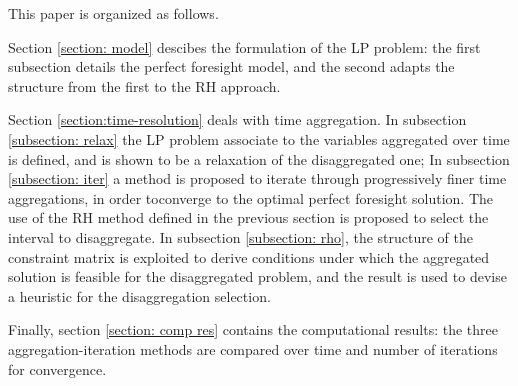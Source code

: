 \documentclass[smallextended,natbib]{svjour3}       %
\numberwithin{theorem}{section}
\begin{document}


This paper is organized as follows. 

Section \ref{section: model} descibes the formulation of the LP problem: the first subsection details the perfect foresight model, and the second adapts the structure from the first to the RH approach. 

Section \ref{section:time-resolution} deals with time aggregation. In subsection \ref{subsection: relax} the LP problem associate to the variables aggregated over time is defined, and is shown to be a relaxation of the disaggregated one; 
In subsection \ref{subsection: iter} a method is proposed to iterate through progressively finer time aggregations, in order toconverge to the optimal perfect foresight solution. The use of the RH method defined in the previous section is proposed to select the interval to disaggregate. 
In subsection \ref{subsection: rho}, the structure of the constraint matrix is exploited to derive conditions under which the aggregated solution is feasible for the disaggregated problem, and the result is used to devise a heuristic for the disaggregation selection. 

Finally, section \ref{section: comp res} contains the computational results: the three aggregation-iteration methods are compared over time and number of iterations for convergence.






\end{document}
